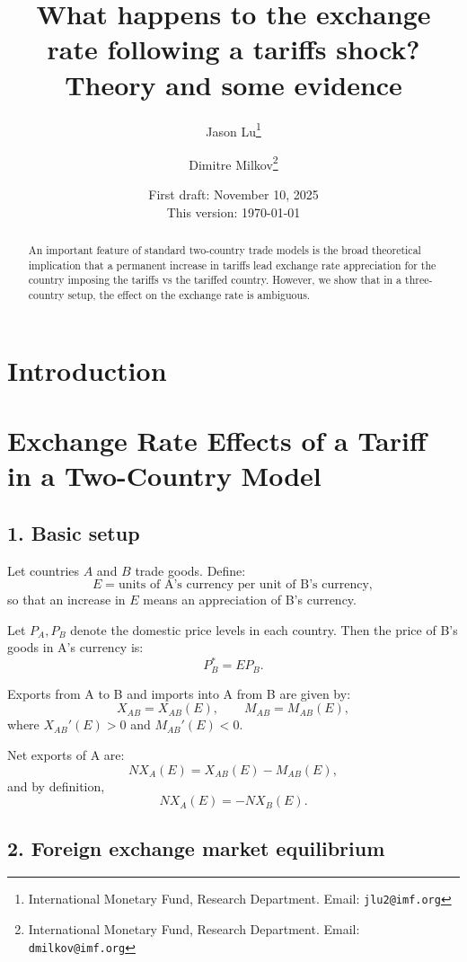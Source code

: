 \documentclass[11pt]{article}
\title{What happens to the exchange rate following a tariffs shock? Theory and some evidence}
\author{
Jason Lu\thanks{International Monetary Fund, Research Department. Email: {\tt jlu2@imf.org}} 
\and 
Dimitre Milkov\thanks{International Monetary Fund, Research Department. Email: {\tt dmilkov@imf.org}}
}
\date{First draft: November 10, 2025 \\ This version: \today}
\begin{document}
\maketitle

\begin{abstract}

An important feature of standard two-country trade models is the broad theoretical implication that a permanent increase in tariffs lead exchange rate appreciation for the country imposing the tariffs vs the tariffed country. However, we show that in a three-country setup, the effect on the exchange rate is ambiguous. 

\end{abstract}



\maketitle

\section{Introduction}



\section*{Exchange Rate Effects of a Tariff in a Two-Country Model}

\subsection*{1. Basic setup}

Let countries \( A \) and \( B \) trade goods.  
Define:
\[
E = \text{units of A's currency per unit of B's currency},
\]
so that an increase in \( E \) means an appreciation of B's currency.

Let \( P_A, P_B \) denote the domestic price levels in each country.  
Then the price of B's goods in A's currency is:
\[
P_B^* = E P_B.
\]

Exports from A to B and imports into A from B are given by:
\[
X_{AB} = X_{AB}(E), \qquad M_{AB} = M_{AB}(E),
\]
where \( X_{AB}'(E) > 0 \) and \( M_{AB}'(E) < 0 \).

Net exports of A are:
\[
NX_A(E) = X_{AB}(E) - M_{AB}(E),
\]
and by definition,
\[
NX_A(E) = -NX_B(E).
\]

\subsection*{2. Foreign exchange market equilibrium}
\end{document}
